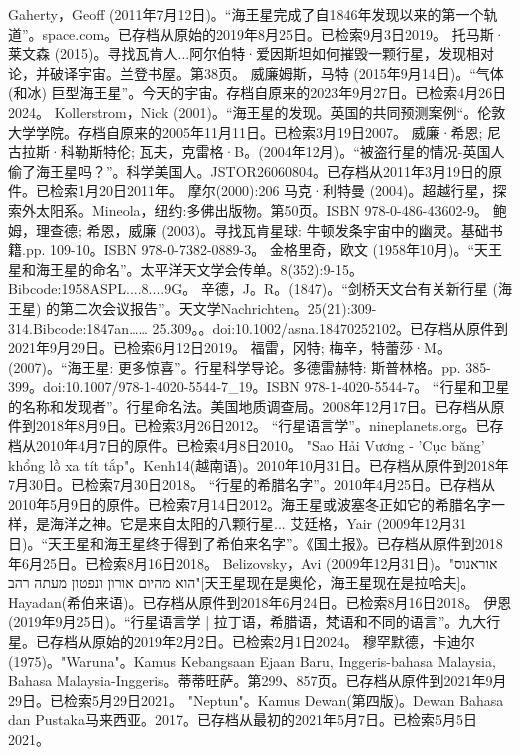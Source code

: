 \begin{enumerate}
 Gaherty，Geoff (2011年7月12日)。“海王星完成了自1846年发现以来的第一个轨道”。space.com。已存档从原始的2019年8月25日。已检索9月3日2019。
 托马斯·莱文森 (2015)。寻找瓦肯人...阿尔伯特·爱因斯坦如何摧毁一颗行星，发现相对论，并破译宇宙。兰登书屋。第38页。
 威廉姆斯，马特 (2015年9月14日)。“气体 (和冰) 巨型海王星”。今天的宇宙。存档自原来的2023年9月27日。已检索4月26日2024。
 Kollerstrom，Nick (2001)。“海王星的发现。英国的共同预测案例“。伦敦大学学院。存档自原来的2005年11月11日。已检索3月19日2007。
 威廉·希恩; 尼古拉斯·科勒斯特伦; 瓦夫，克雷格·B。(2004年12月)。“被盗行星的情况-英国人偷了海王星吗？”。科学美国人。JSTOR26060804。已存档从2011年3月19日的原件。已检索1月20日2011年。 
 摩尔(2000):206
 马克·利特曼 (2004)。超越行星，探索外太阳系。Mineola，纽约:多佛出版物。第50页。ISBN 978-0-486-43602-9。
 鲍姆，理查德; 希恩，威廉 (2003)。寻找瓦肯星球: 牛顿发条宇宙中的幽灵。基础书籍.pp. 109-10。ISBN 978-0-7382-0889-3。
 金格里奇，欧文 (1958年10月)。“天王星和海王星的命名”。太平洋天文学会传单。8(352):9-15。Bibcode:1958ASPL....8....9G。
 辛德，J。R。(1847)。“剑桥天文台有关新行星 (海王星) 的第二次会议报告”。天文学Nachrichten。25(21):309-314.Bibcode:1847an…… 25.309。。doi:10.1002/asna.18470252102。已存档从原件到2021年9月29日。已检索6月12日2019。
 福雷，冈特; 梅辛，特蕾莎·M。(2007)。“海王星: 更多惊喜”。行星科学导论。多德雷赫特: 斯普林格。pp. 385-399。doi:10.1007/978-1-4020-5544-7_19。ISBN 978-1-4020-5544-7。
 “行星和卫星的名称和发现者”。行星命名法。美国地质调查局。2008年12月17日。已存档从原件到2018年8月9日。已检索3月26日2012。
 “行星语言学”。nineplanets.org。已存档从2010年4月7日的原件。已检索4月8日2010。
 "Sao Hải Vương - 'Cục băng' khổng lồ xa tít tắp"。Kenh14(越南语)。2010年10月31日。已存档从原件到2018年7月30日。已检索7月30日2018。
 “行星的希腊名字”。2010年4月25日。已存档从2010年5月9日的原件。已检索7月14日2012。海王星或波塞冬正如它的希腊名字一样，是海洋之神。它是来自太阳的八颗行星...
 艾廷格，Yair (2009年12月31日)。“天王星和海王星终于得到了希伯来名字”。《国土报》。已存档从原件到2018年6月25日。已检索8月16日2018。
 Belizovsky，Avi (2009年12月31日)。"אוראנוס הוא מהיום אורון ונפטון מעתה רהב"[天王星现在是奥伦，海王星现在是拉哈夫]。Hayadan(希伯来语)。已存档从原件到2018年6月24日。已检索8月16日2018。
 伊恩 (2019年9月25日)。“行星语言学 | 拉丁语，希腊语，梵语和不同的语言”。九大行星。已存档从原始的2019年2月2日。已检索2月1日2024。
 穆罕默德，卡迪尔 (1975)。"Waruna"。Kamus Kebangsaan Ejaan Baru, Inggeris-bahasa Malaysia, Bahasa Malaysia-Inggeris。蒂蒂旺萨。第299、857页。已存档从原件到2021年9月29日。已检索5月29日2021。
 "Neptun"。Kamus Dewan(第四版)。Dewan Bahasa dan Pustaka马来西亚。2017。已存档从最初的2021年5月7日。已检索5月5日2021。

\end{enumerate}
